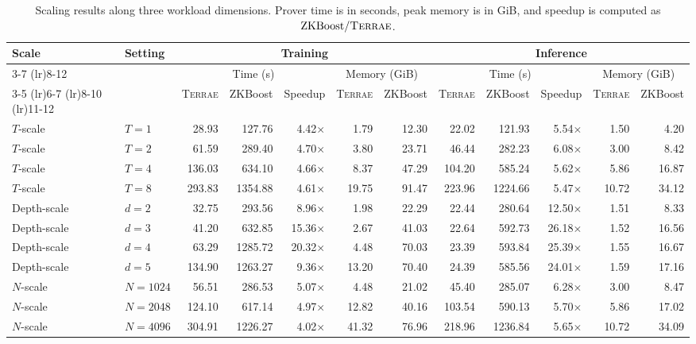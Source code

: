 \begin{table}[t]
    \centering
    \caption{Scaling results along three workload dimensions. Prover time is in
    seconds, peak memory is in GiB, and speedup is computed as
    $\text{ZKBoost}/\textsc{Terrae}$.}
    \label{tab:three-dim-scaling}
    \begin{tabular}{llrrrrrrrrrr}
        \toprule
        \multirow[c]{4}{*}{Scale} & \multirow[c]{4}{*}{Setting}
        & \multicolumn{5}{c}{Training}
        & \multicolumn{5}{c}{Inference} \\
        \cmidrule(lr){3-7} \cmidrule(lr){8-12}
        &
        & \multicolumn{3}{c}{Time (s)}
        & \multicolumn{2}{c}{Memory (GiB)}
        & \multicolumn{3}{c}{Time (s)}
        & \multicolumn{2}{c}{Memory (GiB)} \\
        \cmidrule(lr){3-5} \cmidrule(lr){6-7}
        \cmidrule(lr){8-10} \cmidrule(lr){11-12}
        &
        & \textsc{Terrae} & ZKBoost & Speedup
        & \textsc{Terrae} & ZKBoost
        & \textsc{Terrae} & ZKBoost & Speedup
        & \textsc{Terrae} & ZKBoost \\
        \midrule
        $T$-scale & $T=1$ & 28.93 & 127.76 & 4.42$\times$ & 1.79 & 12.30 & 22.02 & 121.93 & 5.54$\times$ & 1.50 & 4.20 \\
        $T$-scale & $T=2$ & 61.59 & 289.40 & 4.70$\times$ & 3.80 & 23.71 & 46.44 & 282.23 & 6.08$\times$ & 3.00 & 8.42 \\
        $T$-scale & $T=4$ & 136.03 & 634.10 & 4.66$\times$ & 8.37 & 47.29 & 104.20 & 585.24 & 5.62$\times$ & 5.86 & 16.87 \\
        $T$-scale & $T=8$ & 293.83 & 1354.88 & 4.61$\times$ & 19.75 & 91.47 & 223.96 & 1224.66 & 5.47$\times$ & 10.72 & 34.12 \\
        \midrule
        Depth-scale & $d=2$ & 32.75 & 293.56 & 8.96$\times$ & 1.98 & 22.29 & 22.44 & 280.64 & 12.50$\times$ & 1.51 & 8.33 \\
        Depth-scale & $d=3$ & 41.20 & 632.85 & 15.36$\times$ & 2.67 & 41.03 & 22.64 & 592.73 & 26.18$\times$ & 1.52 & 16.56 \\
        Depth-scale & $d=4$ & 63.29 & 1285.72 & 20.32$\times$ & 4.48 & 70.03 & 23.39 & 593.84 & 25.39$\times$ & 1.55 & 16.67 \\
        Depth-scale & $d=5$ & 134.90 & 1263.27 & 9.36$\times$ & 13.20 & 70.40 & 24.39 & 585.56 & 24.01$\times$ & 1.59 & 17.16 \\
        \midrule
        $N$-scale & $N=1024$ & 56.51 & 286.53 & 5.07$\times$ & 4.48 & 21.02 & 45.40 & 285.07 & 6.28$\times$ & 3.00 & 8.47 \\
        $N$-scale & $N=2048$ & 124.10 & 617.14 & 4.97$\times$ & 12.82 & 40.16 & 103.54 & 590.13 & 5.70$\times$ & 5.86 & 17.02 \\
        $N$-scale & $N=4096$ & 304.91 & 1226.27 & 4.02$\times$ & 41.32 & 76.96 & 218.96 & 1236.84 & 5.65$\times$ & 10.72 & 34.09 \\
        \bottomrule
    \end{tabular}
\end{table}

